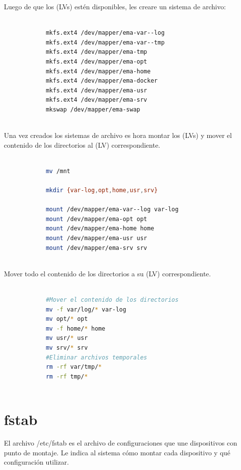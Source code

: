 		
			Luego de que los (LVs) estén disponibles, les creare un sistema de archivo:
			
			\begin{lstlisting}[language=Bash, caption=Crear Sistema de Archivo]
						
			mkfs.ext4 /dev/mapper/ema-var--log
			mkfs.ext4 /dev/mapper/ema-var--tmp
			mkfs.ext4 /dev/mapper/ema-tmp
			mkfs.ext4 /dev/mapper/ema-opt
			mkfs.ext4 /dev/mapper/ema-home
			mkfs.ext4 /dev/mapper/ema-docker
			mkfs.ext4 /dev/mapper/ema-usr
			mkfs.ext4 /dev/mapper/ema-srv
			mkswap /dev/mapper/ema-swap
			
			\end{lstlisting}
			
			\vspace{0.3cm}
			
			Una vez creados los sistemas de archivo es hora montar los (LVs) y mover el contenido de los directorios al (LV) correspondiente.
			
			\begin{lstlisting}[language=Bash, caption=Crear directorios y montar los (LVs)]
				
			mv /mnt
			
			mkdir {var-log,opt,home,usr,srv}
			
			mount /dev/mapper/ema-var--log var-log
			mount /dev/mapper/ema-opt opt
			mount /dev/mapper/ema-home home
			mount /dev/mapper/ema-usr usr
			mount /dev/mapper/ema-srv srv
			
			\end{lstlisting}
			
			\vspace{0.3cm}
			
			Mover todo el contenido de los directorios a su	 (LV) correspondiente.
			
			\begin{lstlisting}[language=Bash, caption=Mover directorios]
			
			#Mover el contenido de los directorios
			mv -f var/log/* var-log
			mv opt/* opt
			mv -f home/* home
			mv usr/* usr
			mv srv/* srv
			#Eliminar archivos temporales
			rm -rf var/tmp/*
			rm -rf tmp/*
			
			\end{lstlisting}
		
		
		\section{fstab}
			
			El archivo /etc/fstab es el archivo de configuraciones que une dispositivos con punto de montaje. Le indica al sistema cómo montar cada dispositivo y qué configuración utilizar.\par
			
